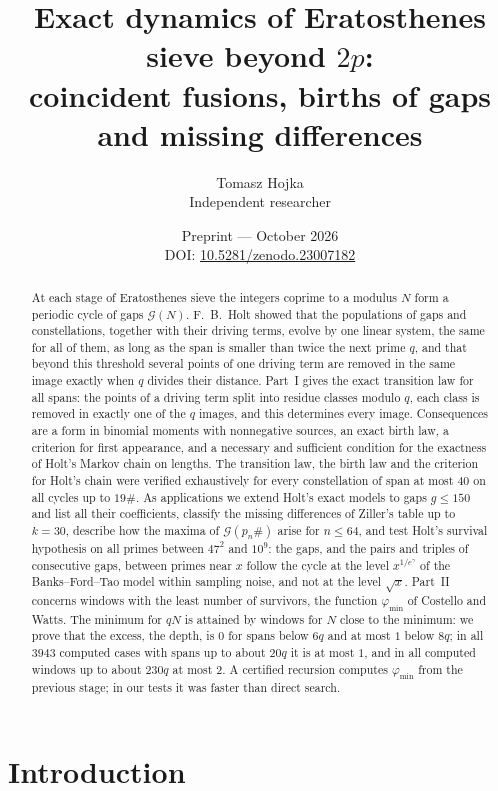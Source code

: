 \documentclass[11pt]{article}
\title{Exact dynamics of Eratosthenes sieve beyond $2p$:\\ coincident fusions, births of gaps and missing differences}
\author{Tomasz Hojka\\ \small Independent researcher}
\date{\small Preprint --- October 2026\\ DOI: \href{https://doi.org/10.5281/zenodo.23007182}{10.5281/zenodo.23007182}}
\theoremstyle{definition}
\theoremstyle{remark}
\newcommand{\G}{\mathcal{G}}
\begin{document}
\maketitle

\begin{abstract}
At each stage of Eratosthenes sieve the integers coprime to a modulus $N$ form a periodic cycle of gaps $\G(N)$. F.~B.~Holt showed that the populations of gaps and constellations, together with their driving terms, evolve by one linear system, the same for all of them, as long as the span is smaller than twice the next prime $q$, and that beyond this threshold several points of one driving term are removed in the same image exactly when $q$ divides their distance. Part~I gives the exact transition law for all spans: the points of a driving term split into residue classes modulo $q$, each class is removed in exactly one of the $q$ images, and this determines every image. Consequences are a form in binomial moments with nonnegative sources, an exact birth law, a criterion for first appearance, and a necessary and sufficient condition for the exactness of Holt's Markov chain on lengths. The transition law, the birth law and the criterion for Holt's chain were verified exhaustively for every constellation of span at most $40$ on all cycles up to $19\#$. As applications we extend Holt's exact models to gaps $g \le 150$ and list all their coefficients, classify the missing differences of Ziller's table up to $k = 30$, describe how the maxima of $\G(p_n\#)$ arise for $n \le 64$, and test Holt's survival hypothesis on all primes between $47^2$ and $10^9$: the gaps, and the pairs and triples of consecutive gaps, between primes near $x$ follow the cycle at the level $x^{1/e^\gamma}$ of the Banks--Ford--Tao model within sampling noise, and not at the level $\sqrt{x}$. Part~II concerns windows with the least number of survivors, the function $\varphi_{\min}$ of Costello and Watts. The minimum for $qN$ is attained by windows for $N$ close to the minimum: we prove that the excess, the depth, is $0$ for spans below $6q$ and at most $1$ below $8q$; in all $3943$ computed cases with spans up to about $20q$ it is at most $1$, and in all computed windows up to about $230q$ at most $2$. A certified recursion computes $\varphi_{\min}$ from the previous stage; in our tests it was faster than direct search.
\end{abstract}

\section{Introduction}
\end{document}
